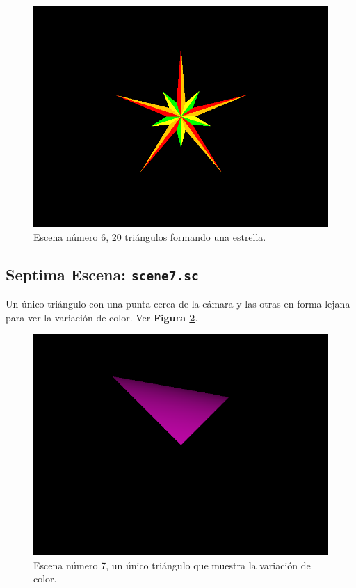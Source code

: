 \documentclass[a4paper,10pt]{article}
\begin{document}
\begin{figure}[h]
 \centering
 \includegraphics[width=320pt,keepaspectratio=true]{../scene6.png}
 \caption{Escena n\'umero 6, 20 tri\'angulos formando una estrella.}
 \label{fig:6}
\end{figure}

\subsection{Septima Escena: \texttt{scene7.sc}}
Un \'unico tri\'angulo con una punta cerca de la c\'amara y las otras en forma lejana para ver la variaci\'on de color.  Ver \textbf{Figura \ref{fig:7}}.

\begin{figure}[h]
 \centering
 \includegraphics[width=320pt,keepaspectratio=true]{../scene7.png}
 \caption{Escena n\'umero 7, un \'unico tri\'angulo que muestra la variaci\'on de color.}
 \label{fig:7}
\end{figure}
\end{document}
